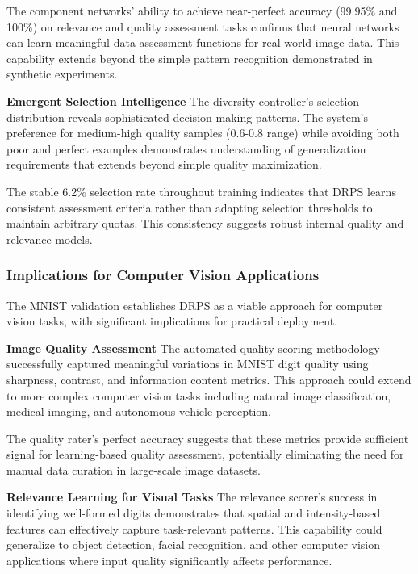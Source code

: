\documentclass[12pt]{article}
\begin{document}
The component networks' ability to achieve near-perfect accuracy (99.95\% and 100\%) on relevance and quality assessment tasks confirms that neural networks can learn meaningful data assessment functions for real-world image data. This capability extends beyond the simple pattern recognition demonstrated in synthetic experiments.

\textbf{Emergent Selection Intelligence}
The diversity controller's selection distribution reveals sophisticated decision-making patterns. The system's preference for medium-high quality samples (0.6-0.8 range) while avoiding both poor and perfect examples demonstrates understanding of generalization requirements that extends beyond simple quality maximization.

The stable 6.2\% selection rate throughout training indicates that DRPS learns consistent assessment criteria rather than adapting selection thresholds to maintain arbitrary quotas. This consistency suggests robust internal quality and relevance models.

\subsubsection{Implications for Computer Vision Applications}\label{cv-implications}

The MNIST validation establishes DRPS as a viable approach for computer vision tasks, with significant implications for practical deployment.

\textbf{Image Quality Assessment}
The automated quality scoring methodology successfully captured meaningful variations in MNIST digit quality using sharpness, contrast, and information content metrics. This approach could extend to more complex computer vision tasks including natural image classification, medical imaging, and autonomous vehicle perception.

The quality rater's perfect accuracy suggests that these metrics provide sufficient signal for learning-based quality assessment, potentially eliminating the need for manual data curation in large-scale image datasets.

\textbf{Relevance Learning for Visual Tasks}
The relevance scorer's success in identifying well-formed digits demonstrates that spatial and intensity-based features can effectively capture task-relevant patterns. This capability could generalize to object detection, facial recognition, and other computer vision applications where input quality significantly affects performance.
\end{document}
